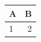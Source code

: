 \documentclass{article}
\begin{document}
\begin{tabular}{lr}
\toprule A&B\\ \midrule 1&2\\ \bottomrule
\end{tabular}
\end{document}
